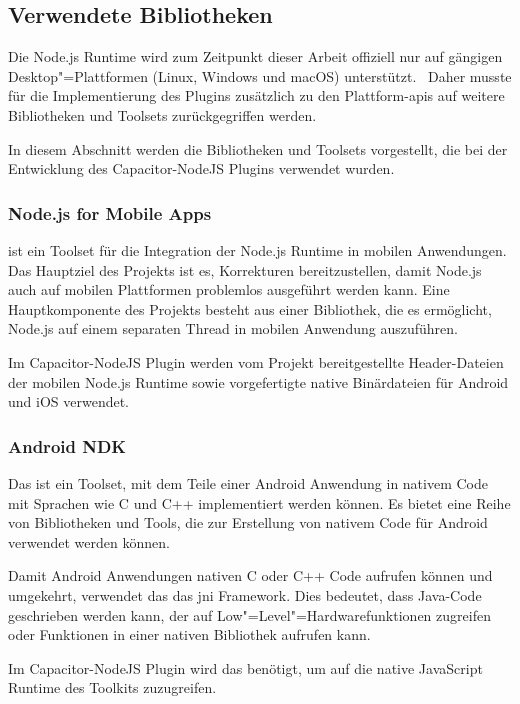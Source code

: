 
\subsection{Verwendete Bibliotheken}

Die Node.js Runtime wird zum Zeitpunkt dieser Arbeit offiziell nur auf gängigen Desktop"=Plattformen (Linux, Windows und macOS) unterstützt.~\cite{nodejs}
Daher musste für die Implementierung des Plugins zusätzlich zu den Plattform-\acsp{api} auf weitere Bibliotheken und Toolsets zurückgegriffen werden.

In diesem Abschnitt werden die Bibliotheken und Toolsets vorgestellt, die bei der Entwicklung des Capacitor-NodeJS Plugins verwendet wurden.

\subsubsection{Node.js for Mobile Apps}

 ist ein Toolset für die Integration der Node.js Runtime in mobilen Anwendungen.
Das Hauptziel des Projekts ist es, Korrekturen bereitzustellen, damit Node.js auch auf mobilen Plattformen problemlos ausgeführt werden kann.
Eine Hauptkomponente des Projekts besteht aus einer Bibliothek, die es ermöglicht, Node.js auf einem separaten Thread in mobilen Anwendung auszuführen.
\cite{nodejs-mobile, nodejs-mobile:docs}

Im Capacitor-NodeJS Plugin werden vom Projekt bereitgestellte Header-Dateien der mobilen Node.js Runtime sowie vorgefertigte native Binärdateien für Android und iOS verwendet.

\subsubsection{Android NDK}

Das  ist ein Toolset, mit dem Teile einer Android Anwendung in nativem Code mit Sprachen wie C und C++ implementiert werden können.
Es bietet eine Reihe von Bibliotheken und Tools, die zur Erstellung von nativem Code für Android verwendet werden können.
\cite{android:ndk}

Damit Android Anwendungen nativen C oder C++ Code aufrufen können und umgekehrt, verwendet das  das \ac{jni} Framework.
Dies bedeutet, dass Java-Code geschrieben werden kann, der auf Low"=Level"=Hardwarefunktionen zugreifen oder Funktionen in einer nativen Bibliothek aufrufen kann.
\cite{android:ndk}

Im Capacitor-NodeJS Plugin wird das  benötigt, um auf die native JavaScript Runtime des  Toolkits zuzugreifen.
\cite{nodejs-mobile:docs}

\printfn
